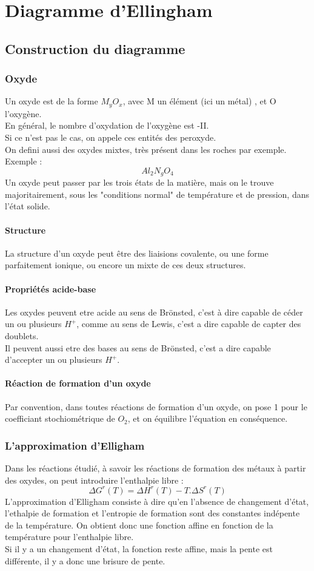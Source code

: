 
\chapter{Diagramme d'Ellingham}
\section{Construction du diagramme}
\subsection{Oxyde}
\begin{de}
Un oxyde est de la forme $M_yO_x$, avec M un élément (ici un métal) , et O l'oxygène.\\
En général, le nombre d'oxydation de l'oxygène est -II.\\
Si ce n'est pas le cas, on appele ces entités des peroxyde.\\
On defini aussi des oxydes mixtes, très présent dans les roches par exemple. Exemple : 
$$Al_2N_gO_4$$
Un oxyde peut passer par les trois états de la matière, mais on le trouve majoritairement, sous les "conditions normal" de température et de pression, dans l'état solide.
\end{de}
\subsubsection{Structure}
La structure d'un oxyde peut être des liaisions covalente, ou une forme parfaitement ionique, ou encore un mixte de ces deux structures.
\subsubsection{Propriétés acide-base}
Les oxydes peuvent etre acide au sens de Brönsted, c'est à dire capable de céder un ou plusieurs $H^+$, comme au sens de Lewis, c'est a dire capable de capter des doublets.\\
Il peuvent aussi etre des bases au sens de Brönsted, c'est a dire capable d'accepter un ou plusieurs $H^+$.
\subsubsection{Réaction de formation d'un oxyde}
Par convention, dans toutes réactions de formation d'un oxyde, on pose 1 pour le coefficiant stochiométrique de $O_2$, et on équilibre l'équation en conséquence.
\subsection{L'approximation d'Elligham}
Dans les réactions étudié, à savoir les réactions de formation des métaux à partir des oxydes, on peut introduire l'enthalpie libre :
$$\Delta G^r (T) = \Delta H^r (T) - T.\Delta S^r(T)$$
L'approximation d'Elligham consiste à dire qu'en l'absence de changement d'état, l'ethalpie de formation et l'entropie de formation sont des constantes indépente de la température. On obtient donc une fonction affine en fonction de la température pour l'enthalpie libre.\\
Si il y a un changement d'état, la fonction reste affine, mais la pente est différente, il y a donc une brisure de pente.

